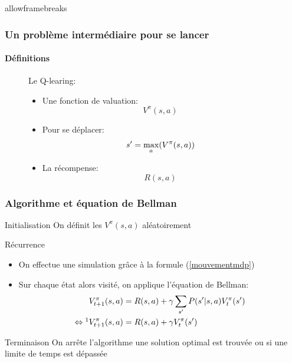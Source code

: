\documentclass[8pt]{beamer}
\begin{document}
\begin{frame}{allowframebreaks}{\label{2}}
  \frametitle{Un problème intermédiaire pour se lancer}
  \framesubtitle{Définitions}
  \begin{figure}
    
    \begin{minipage}[c]{.55\linewidth}
      \centering
      
    \end{minipage}
    \hfill%
    \begin{minipage}[c]{.37\linewidth}
      \centering
      Le Q-learing:
      \begin{itemize}
      \item Une fonction de valuation: \begin{equation} V^{\pi}(s, a) \end{equation}
        \item Pour se déplacer:
          \begin{equation}{\label{mouvementmdp}}
            s' = \max_{a}(V^{\pi}(s, a))
          \end{equation}
        \item La récompense: \begin{equation} R(s, a) \end{equation}
      \end{itemize}
    \end{minipage}
  \end{figure}
\end{frame}


\begin{frame}

  \frametitle{Algorithme et équation de Bellman}

  \begin{block}{Initialisation}
    On définit les $V^{\pi}(s, a)$ aléatoirement
  \end{block}

  \begin{block}{Récurrence}
    \begin{itemize}
    \item On effectue une simulation grâce à la formule (\ref{mouvementmdp})
    \item Sur chaque état alors visité, on applique l'équation de Bellman:
     \begin{align}
       V^{\pi}_{t+1}(s, a)&=R(s, a)+\gamma \sum _{s'}P(s'|s, a)V^{\pi }_{t}(s') \\
       \Leftrightarrow\footnotemark V^{\pi}_{t+1}(s, a)&=R(s, a)+\gamma V_t^{\pi}(s')
     \end{align}
     
    \end{itemize}
  \end{block}
  
  \begin{block}{Terminaison}
    On arrête l'algorithme une solution optimal est trouvée ou si une limite de temps est dépassée
  \end{block}

\end{frame}
\end{document}
